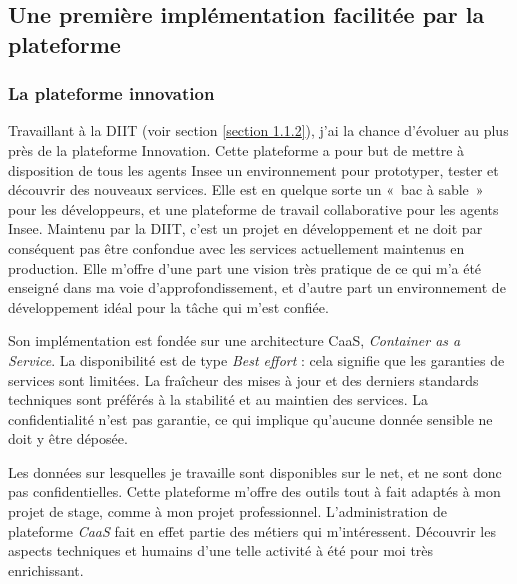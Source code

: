 \subsection{Une première implémentation facilitée par la plateforme}

\subsubsection{La plateforme innovation}
Travaillant à la DIIT (voir section \ref{section 1.1.2}), j'ai la chance d'évoluer au plus près de la plateforme Innovation. Cette plateforme a pour but de mettre à disposition de tous les agents Insee un environnement pour prototyper, tester et découvrir des nouveaux services. Elle est en quelque sorte un «~bac à sable~» pour les développeurs, et une plateforme de travail collaborative pour les agents Insee. Maintenu par la DIIT, c'est un projet en développement et ne doit par conséquent pas être confondue avec les services actuellement maintenus en production. Elle m'offre d'une part une vision très pratique de ce qui m'a été enseigné dans ma voie d'approfondissement, et d'autre part un environnement de développement idéal pour la tâche qui m'est confiée.
\newline

Son implémentation est fondée sur une architecture CaaS, \textit{Container as a Service}. La disponibilité est de type \textit{Best effort} : cela signifie que les garanties de services sont limitées. La fraîcheur des mises à jour et des derniers standards techniques sont préférés à la stabilité et au maintien des services. La confidentialité n'est pas garantie, ce qui implique qu'aucune donnée sensible ne doit y être déposée.
\newline

Les données sur lesquelles je travaille sont disponibles sur le net, et ne sont donc pas confidentielles. Cette plateforme m'offre des outils tout à fait adaptés à mon projet de stage, comme à mon projet professionnel. L'administration de plateforme \textit{CaaS} fait en effet partie des métiers qui m'intéressent. Découvrir les aspects techniques et humains d'une telle activité à été pour moi très enrichissant.
\label{section 2.2.1}

